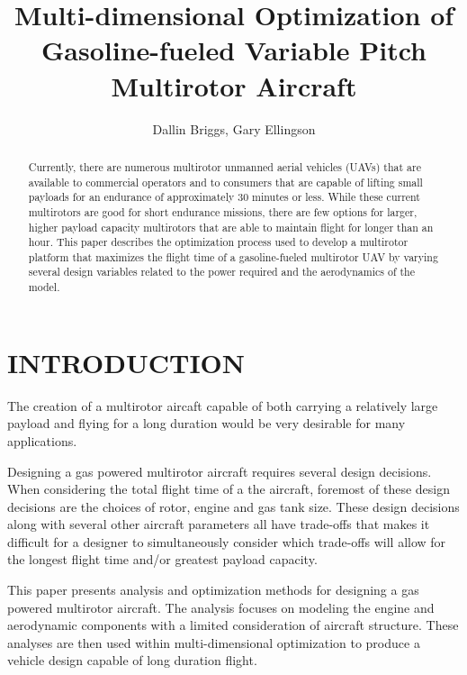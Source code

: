 \documentclass[letterpaper, 10 pt, conference]{ieeeconf}  %
\title{\LARGE \bf
Multi-dimensional Optimization of Gasoline-fueled Variable Pitch Multirotor Aircraft
}
\author{Dallin Briggs, Gary Ellingson%
}
\begin{document}
\maketitle
\thispagestyle{empty}
\pagestyle{empty}


\begin{abstract}

Currently, there are numerous multirotor unmanned aerial vehicles (UAVs) that are available to commercial operators and to consumers that are capable of lifting small payloads for an endurance of approximately 30 minutes or less. While these current multirotors are good for short endurance missions, there are few options for larger, higher payload capacity multirotors that are able to maintain flight for longer than an hour. This paper describes the optimization process used to develop a multirotor platform that maximizes the flight time of a gasoline-fueled multirotor UAV by varying several design variables related to the power required and the aerodynamics of the model.

\end{abstract}


\section{INTRODUCTION}

The creation of a multirotor aircaft capable of both carrying a relatively large payload and flying for a long duration would be very desirable for many applications.

Designing a gas powered multirotor aircraft requires several design decisions. When considering the total flight time of a the aircraft, foremost of these design decisions are the choices of rotor, engine and gas tank size.  These design decisions along with several other aircraft parameters all have trade-offs that makes it difficult for a designer to simultaneously consider which trade-offs will allow for the longest flight time and/or greatest payload capacity. 

This paper presents analysis and optimization methods for designing a gas powered multirotor aircraft.  The analysis focuses on modeling the engine and aerodynamic components with a limited consideration of aircraft structure.  These analyses are then used within multi-dimensional optimization to produce a vehicle design capable of long duration flight. 
\end{document}
